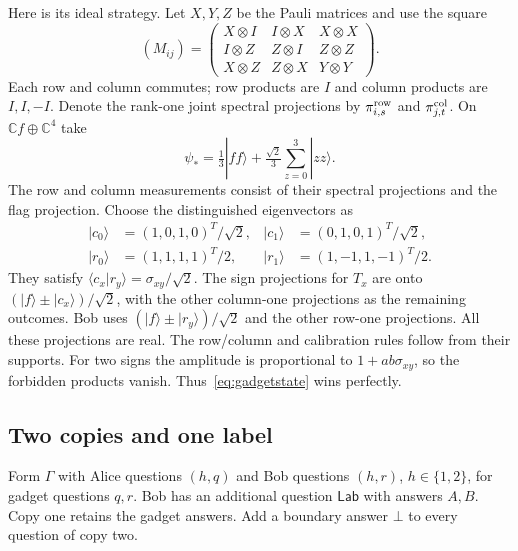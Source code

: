 \documentclass[11pt]{article}
\theoremstyle{definition}
\begin{document}
Here is its ideal strategy. Let $X,Y,Z$ be the Pauli matrices and use the square
\begin{equation}\label{eq:square}
(M_{ij})=\begin{pmatrix}
X\otimes I&I\otimes X&X\otimes X\\
I\otimes Z&Z\otimes I&Z\otimes Z\\
X\otimes Z&Z\otimes X&Y\otimes Y
\end{pmatrix}.
\end{equation}
Each row and column commutes; row products are $I$ and column products are $I,I,-I$. Denote the rank-one joint spectral projections by $\pi^{\rm row}_{i,s}$ and $\pi^{\rm col}_{j,t}$. On $\mathbb C f\oplus\mathbb C^4$ take
\begin{equation}\label{eq:gadgetstate}
\psi_*=\tfrac13|ff\rangle+\tfrac{\sqrt2}{3}\sum_{z=0}^3|zz\rangle.
\end{equation}
The row and column measurements consist of their spectral projections and the flag projection. Choose the distinguished eigenvectors as
\begin{align*}
|c_0\rangle&=(1,0,1,0)^T/\sqrt2,& |c_1\rangle&=(0,1,0,1)^T/\sqrt2,\\
|r_0\rangle&=(1,1,1,1)^T/2,& |r_1\rangle&=(1,-1,1,-1)^T/2.
\end{align*}
They satisfy $\langle c_x|r_y\rangle=\sigma_{xy}/\sqrt2$. The sign projections for $T_x$ are onto $(|f\rangle\pm|c_x\rangle)/\sqrt2$, with the other column-one projections as the remaining outcomes. Bob uses $(|f\rangle\pm|r_y\rangle)/\sqrt2$ and the other row-one projections. All these projections are real. The row/column and calibration rules follow from their supports. For two signs the amplitude is proportional to $1+ab\sigma_{xy}$, so the forbidden products vanish. Thus~\eqref{eq:gadgetstate} wins perfectly.

\subsection{Two copies and one label}
Form $\Gamma$ with Alice questions $(h,q)$ and Bob questions $(h,r)$, $h\in\{1,2\}$, for gadget questions $q,r$. Bob has an additional question $\mathsf{Lab}$ with answers $A,B$. Copy one retains the gadget answers. Add a boundary answer $\bot$ to every question of copy two.
\end{document}
